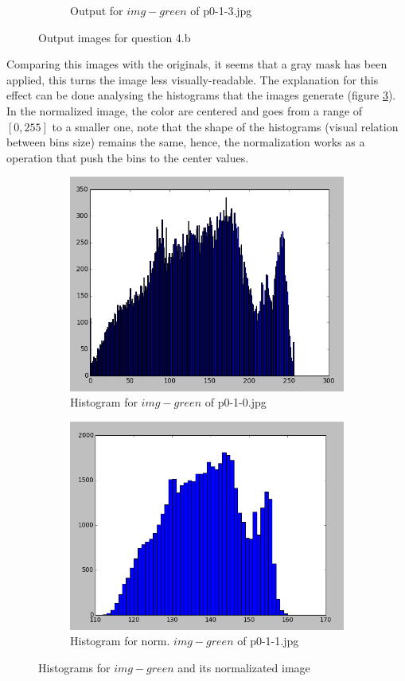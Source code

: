 \begin{enumerate}[label=\emph{\alph*)}]
\begin{figure}[h!]
\begin{subfigure}{0.5\textwidth}
  \caption{Output for $img-green$ of p0-1-3.jpg}
  \label{fig:sfig4}
\end{subfigure}
\caption{Output images for question 4.b}
\label{fig:green-normalization}
\end{figure}

Comparing this images with the originals, it seems that a gray mask has been applied, this turns the image less visually-readable. The explanation for this effect can be done analysing the histograms that the images generate (figure \ref{fig:hist-normalization}). In the normalized image, the color are centered and goes from a range of $[0, 255]$ to a smaller one, note that the shape of the histograms (visual relation between bins size) remains the same, hence, the normalization works as a operation that push the bins to the center values.


\begin{figure}[h!]
\centering
\begin{subfigure}{0.5\textwidth}
  \centering
  \includegraphics[width=0.5\linewidth]{../dbg/hist-original.png}
  \caption{Histogram for $img-green$ of p0-1-0.jpg}
\end{subfigure}%
\begin{subfigure}{0.5\textwidth}
  \centering
  \includegraphics[width=0.5\linewidth]{../dbg/hist-normalized.png}
  \caption{Histogram for norm. $img-green$ of  p0-1-1.jpg}
\end{subfigure}
\caption{Histograms for $img-green$ and its normalizated image}
\label{fig:hist-normalization}
\end{figure}



\end{enumerate}
